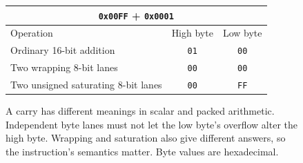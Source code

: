 \begin{figure}[htbp]
  \centering
  \begin{tabular}{@{}lcc@{}}
    \toprule
    \multicolumn{3}{c}{\texttt{0x00FF} + \texttt{0x0001}} \\
    \midrule
    Operation & High byte & Low byte \\
    \midrule
    Ordinary 16-bit addition & \texttt{01} & \texttt{00} \\
    Two wrapping 8-bit lanes & \texttt{00} & \texttt{00} \\
    Two unsigned saturating 8-bit lanes & \texttt{00} & \texttt{FF} \\
    \bottomrule
  \end{tabular}
  \caption{A carry has different meanings in scalar and packed arithmetic. Independent byte lanes must not let the low byte's overflow alter the high byte. Wrapping and saturation also give different answers, so the instruction's semantics matter. Byte values are hexadecimal.}
  \label{fig:packed-byte-carry}
\end{figure}
